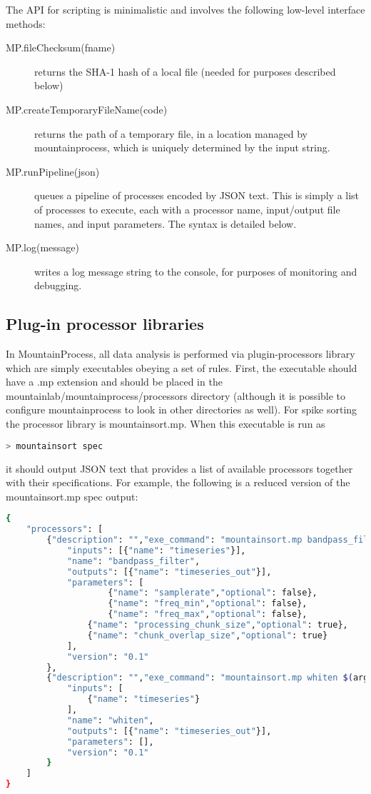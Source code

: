 \documentclass{article}
\begin{document}
The API for scripting is minimalistic and involves the following low-level interface methods:
\begin{description}
\item[MP.fileChecksum(fname)] returns the SHA-1 hash of a local file (needed for purposes described below)
\item[MP.createTemporaryFileName(code)] returns the path of a temporary file, in a location managed by mountainprocess, which is uniquely determined by the input string.
\item[MP.runPipeline(json)] queues a pipeline of processes encoded by JSON text. This is simply a list of processes to execute, each with a processor name, input/output file names, and input parameters. The syntax is detailed below.
\item[MP.log(message)] writes a log message string to the console, for purposes of monitoring and debugging.

\end{description}

\subsection{Plug-in processor libraries}

In MountainProcess, all data analysis is performed via plugin-processors library which are simply executables obeying a set of rules. First, the executable should have a .mp extension and should be placed in the mountainlab/mountainprocess/processors directory (although it is possible to configure mountainprocess to look in other directories as well). For spike sorting the processor library is mountainsort.mp. When this executable is run as
\begin{lstlisting}[language=bash]
> mountainsort spec
\end{lstlisting}
it should output JSON text that provides a list of available processors together with their specifications. For example, the following is a reduced version of the mountainsort.mp spec output:
\begin{lstlisting}[language=bash]
{
    "processors": [
        {"description": "","exe_command": "mountainsort.mp bandpass_filter $(arguments)",
            "inputs": [{"name": "timeseries"}],
            "name": "bandpass_filter",
            "outputs": [{"name": "timeseries_out"}],
            "parameters": [
                    {"name": "samplerate","optional": false},
                    {"name": "freq_min","optional": false},
                    {"name": "freq_max","optional": false},
                {"name": "processing_chunk_size","optional": true},
                {"name": "chunk_overlap_size","optional": true}
            ],
            "version": "0.1"
        },
        {"description": "","exe_command": "mountainsort.mp whiten $(arguments)",
            "inputs": [
                {"name": "timeseries"}
            ],
            "name": "whiten",
            "outputs": [{"name": "timeseries_out"}],
            "parameters": [],
            "version": "0.1"
        }
    ]
}
\end{lstlisting}
\end{document}
